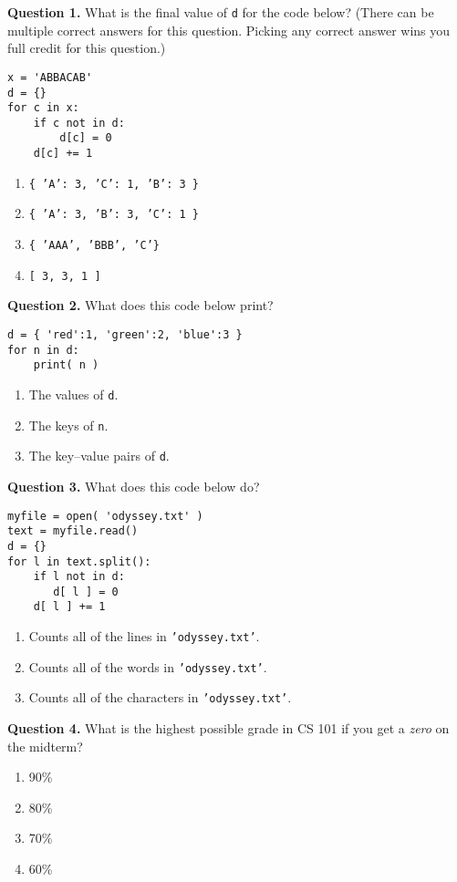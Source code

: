 \documentclass[12pt]{article}
\begin{document}


{\bf Question 1.}   What is the final value of \texttt{d} for the code below? (There can be multiple correct answers for this question. Picking any correct answer wins you full credit for this question.)
\begin{lstlisting}[frame=single]
x = 'ABBACAB'
d = {}
for c in x:
    if c not in d:
        d[c] = 0
    d[c] += 1
\end{lstlisting}
\vspace{-0.5cm}
  \begin{enumerate}[label=\Alph*]
 \item  \texttt{\{ 'A': 3, 'C': 1, 'B': 3 \}}
 \item  \texttt{\{ 'A': 3, 'B': 3, 'C': 1 \}}
 \item  \texttt{\{ 'AAA', 'BBB', 'C'\}}
 \item  \texttt{[ 3, 3, 1 ]}
  \end{enumerate}

{\bf Question 2.}    What does this code below print?
\begin{lstlisting}[frame=single]
d = { 'red':1, 'green':2, 'blue':3 }
for n in d:
    print( n )
\end{lstlisting}
\vspace{-0.5cm}
\begin{enumerate}[label=\Alph*]
  \item  The values of \texttt{d}.
  \item  The keys of \texttt{n}.
  \item  The key--value pairs of \texttt{d}.
\end{enumerate}

{\bf Question 3.} What does this code below do?
\begin{lstlisting}[frame=single]
myfile = open( 'odyssey.txt' )
text = myfile.read()
d = {}
for l in text.split():
    if l not in d:
       d[ l ] = 0
    d[ l ] += 1
\end{lstlisting}
\vspace{-0.5cm}
\begin{enumerate}[label=\Alph*]
	 \item  Counts all of the lines in \texttt{'odyssey.txt'}.
	 \item  Counts all of the words in \texttt{'odyssey.txt'}.
	 \item  Counts all of the characters in \texttt{'odyssey.txt'}.
\end{enumerate}

{\bf Question 4.}   What is the highest possible grade in CS 101 if you get a \emph{zero} on the midterm?
\vspace{-0.5cm}
\begin{enumerate}[label=\Alph*]
   \item  90\%
   \item  80\%
   \item  70\%
   \item  60\%
\end{enumerate}
\end{document}
